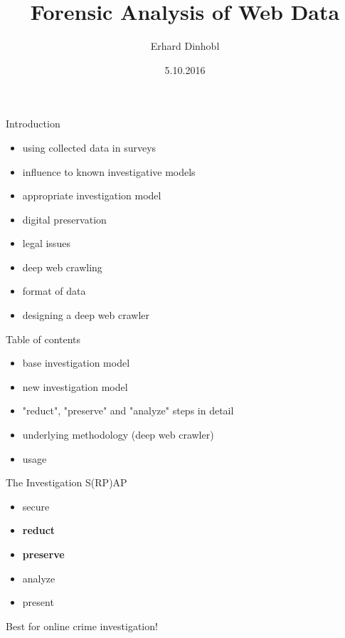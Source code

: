 \documentclass{beamer}
\title[]{Forensic Analysis of Web Data}
\author{Erhard Dinhobl}
\institute{Vienna University of Technology - Information and Software Engineering Group}
\date{5.10.2016}
\begin{document}
\begin{frame}
  \titlepage
\end{frame}


\begin{frame}{Introduction}

\begin{itemize}
  \item using collected data in surveys
  \item influence to known investigative models
  \item appropriate investigation model
  \item digital preservation
  \item legal issues
  \item deep web crawling
  \item format of data
  \item designing a deep web crawler
\end{itemize}

\end{frame}

\begin{frame}{Table of contents}

\begin{itemize}
  \item base investigation model
  \item new investigation model
  \item "reduct", "preserve" and "analyze" steps in detail
  \item underlying methodology (deep web crawler)
  \item usage
\end{itemize}
\end{frame}


\begin{frame}{The Investigation S(RP)AP}
\begin{itemize}
  \item secure
  \item \textbf{reduct}
  \item \textbf{preserve}
  \item analyze
  \item present
\end{itemize}

Best for online crime investigation!

\end{frame}
\end{document}
